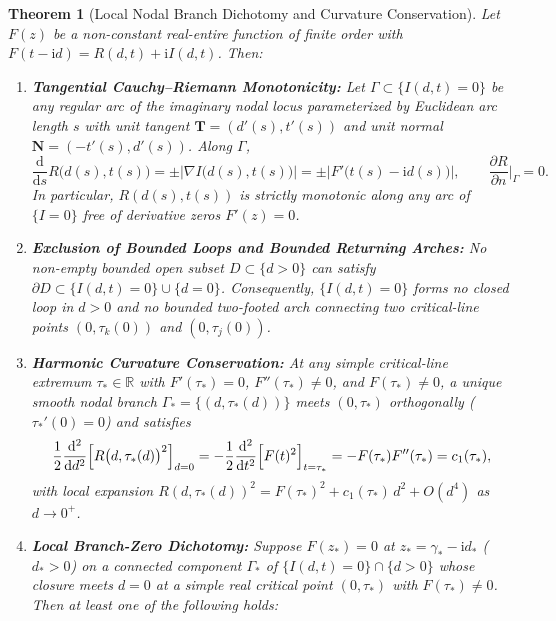 \documentclass[11pt,reqno]{amsart}
\newtheorem{theorem}{Theorem}[section]
\theoremstyle{definition}
\theoremstyle{remark}
\numberwithin{equation}{section}
\newcommand{\dd}{\mathrm{d}}
\newcommand{\ii}{\mathrm{i}}
\begin{document}
\begin{theorem}[Local Nodal Branch Dichotomy and Curvature Conservation]\label{thm:nodal-dichotomy}
Let $F(z)$ be a non-constant real-entire function of finite order with $F(t-\ii d)=R(d,t)+\ii I(d,t)$. Then:
\begin{enumerate}[label=\upshape(\alph*),leftmargin=2.2em]
\item \textbf{Tangential Cauchy--Riemann Monotonicity:} Let $\Gamma \subset \{I(d,t)=0\}$ be any regular arc of the imaginary nodal locus parameterized by Euclidean arc length $s$ with unit tangent $\mathbf{T} = (d'(s),t'(s))$ and unit normal $\mathbf{N} = (-t'(s),d'(s))$. Along $\Gamma$,
\begin{equation}\label{eq:tangential-CR}
\frac{\dd}{\dd s}R\bigl(d(s),t(s)\bigr) = \pm \bigl|\nabla I\bigl(d(s),t(s)\bigr)\bigr| = \pm \bigl|F'\bigl(t(s)-\ii d(s)\bigr)\bigr|, \qquad \frac{\partial R}{\partial n}\Big|_\Gamma = 0.
\end{equation}
In particular, $R(d(s),t(s))$ is strictly monotonic along any arc of $\{I=0\}$ free of derivative zeros $F'(z)=0$.
\item \textbf{Exclusion of Bounded Loops and Bounded Returning Arches:} No non-empty bounded open subset $D \subset \{d>0\}$ can satisfy $\partial D \subset \{I(d,t)=0\} \cup \{d=0\}$. Consequently, $\{I(d,t)=0\}$ forms no closed loop in $d>0$ and no bounded two-footed arch connecting two critical-line points $(0,\tau_k(0))$ and $(0,\tau_j(0))$.
\item \textbf{Harmonic Curvature Conservation:} At any simple critical-line extremum $\tau_* \in \mathbb{R}$ with $F'(\tau_*)=0$, $F''(\tau_*)\ne 0$, and $F(\tau_*)\ne 0$, a unique smooth nodal branch $\Gamma_* = \{(d,\tau_*(d))\}$ meets $(0,\tau_*)$ orthogonally ($\tau_*'(0)=0$) and satisfies
\begin{equation}\label{eq:harmonic-curvature-conservation}
\frac{1}{2}\frac{\dd^2}{\dd d^2}\Bigl[R\bigl(d,\tau_*(d)\bigr)^2\Bigr]_{d=0} = -\frac{1}{2}\frac{\dd^2}{\dd t^2}\Bigl[F(t)^2\Bigr]_{t=\tau_*} = -F(\tau_*)F''(\tau_*) = c_1(\tau_*),
\end{equation}
with local expansion $R(d,\tau_*(d))^2 = F(\tau_*)^2 + c_1(\tau_*)\,d^2 + O(d^4)$ as $d \to 0^+$.
\item \textbf{Local Branch-Zero Dichotomy:} Suppose $F(z_*)=0$ at $z_* = \gamma_* - \ii d_*$ ($d_* > 0$) on a connected component $\Gamma_*$ of $\{I(d,t)=0\}\cap\{d>0\}$ whose closure meets $d=0$ at a simple real critical point $(0,\tau_*)$ with $F(\tau_*)\ne 0$. Then at least one of the following holds:

\end{enumerate}
\end{theorem}
\end{document}
